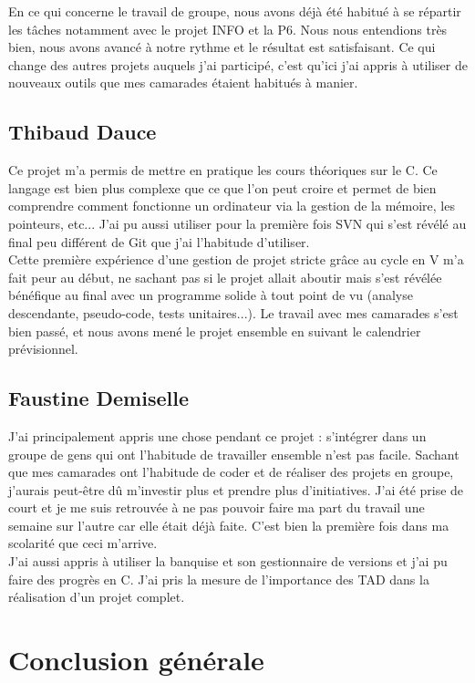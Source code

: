 	En ce qui concerne le travail de groupe, nous avons déjà été habitué à se répartir les tâches notamment avec le projet INFO et la P6. Nous nous entendions très 
	bien, nous avons avancé à notre rythme et le résultat est satisfaisant. Ce qui change des autres projets auquels j'ai participé, c'est qu'ici j'ai appris 
	à utiliser de nouveaux outils que mes camarades étaient habitués à manier.
	
	\section{Thibaud Dauce}
	Ce projet m'a permis de mettre en pratique les cours théoriques sur le C. Ce langage est bien plus complexe que ce que l'on peut croire et permet de bien comprendre comment fonctionne un ordinateur via la gestion de la mémoire, les pointeurs, etc... J'ai pu aussi utiliser pour la première fois SVN qui s'est révélé au final peu différent de Git que j'ai l'habitude d'utiliser. \\

	Cette première expérience d'une gestion de projet stricte grâce au cycle en V m'a fait peur au début, ne sachant pas si le projet allait aboutir mais s'est révélée bénéfique au final avec un programme solide à tout point de vu (analyse descendante, pseudo-code, tests unitaires...). Le travail avec mes camarades s'est bien passé, et nous avons mené le projet ensemble en suivant le calendrier prévisionnel. 

	\section{Faustine Demiselle}
	J'ai principalement appris une chose pendant ce projet : s'intégrer dans un groupe de gens qui ont l'habitude de travailler ensemble n'est pas facile. Sachant que mes camarades ont l'habitude de coder et de réaliser des projets en groupe, j'aurais peut-être dû m'investir plus et prendre plus d'initiatives. J'ai été prise de court et je me suis retrouvée à ne pas pouvoir faire ma part du travail une semaine sur l'autre car elle était déjà faite. C'est bien la première fois dans ma scolarité que ceci m'arrive.\\

	J'ai aussi appris à utiliser la banquise et son gestionnaire de versions et j'ai pu faire des progrès en C. J'ai pris la mesure de l'importance des TAD dans la réalisation d'un projet complet. 

\chapter{Conclusion générale}
\minitoc
